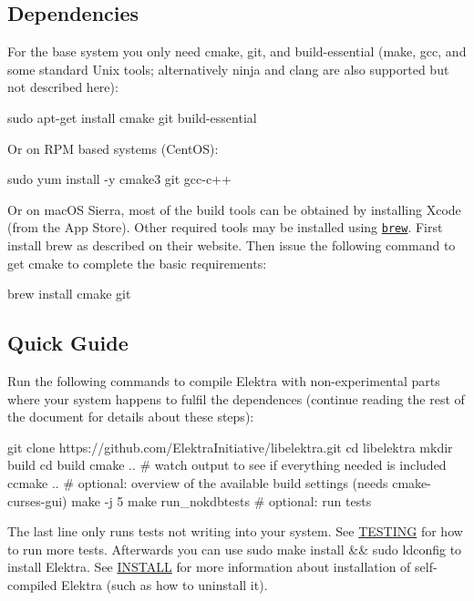 \subsection*{Dependencies}

For the base system you only need cmake, git, and build-\/essential (make, gcc, and some standard Unix tools; alternatively ninja and clang are also supported but not described here)\+: \begin{DoxyVerb}    sudo apt-get install cmake git build-essential
\end{DoxyVerb}


Or on R\+PM based systems (Cent\+OS)\+: \begin{DoxyVerb}    sudo yum install -y cmake3 git gcc-c++
\end{DoxyVerb}


Or on mac\+OS Sierra, most of the build tools can be obtained by installing Xcode (from the App Store). Other required tools may be installed using \href{http://brew.sh/}{\tt brew}. First install brew as described on their website. Then issue the following command to get cmake to complete the basic requirements\+: \begin{DoxyVerb}    brew install cmake git
\end{DoxyVerb}


\subsection*{Quick Guide}

Run the following commands to compile Elektra with non-\/experimental parts where your system happens to fulfil the dependences (continue reading the rest of the document for details about these steps)\+:


\begin{DoxyCode}
git clone https://github.com/ElektraInitiative/libelektra.git
cd libelektra
mkdir build
cd build
cmake ..  # watch output to see if everything needed is included
ccmake .. # optional: overview of the available build settings (needs cmake-curses-gui)
make -j 5
make run\_nokdbtests  # optional: run tests
\end{DoxyCode}


The last line only runs tests not writing into your system. See \hyperlink{doc_TESTING_md}{T\+E\+S\+T\+I\+NG} for how to run more tests. Afterwards you can use {\ttfamily sudo make install \&\& sudo ldconfig} to install Elektra. See \hyperlink{doc_INSTALL_md}{I\+N\+S\+T\+A\+LL} for more information about installation of self-\/compiled Elektra (such as how to uninstall it).

